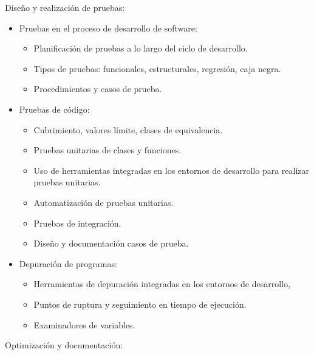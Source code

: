 \documentclass[a4paper]{article}
\begin{document}
Diseño y realización de pruebas:
\begin{itemize}
\item Pruebas en el proceso de desarrollo de software:
\begin{itemize}
\item Planificación de pruebas a lo largo del ciclo de desarrollo.
\item Tipos de pruebas: funcionales, estructurales, regresión, caja negra.
\item Procedimientos y casos de prueba.
\end{itemize}
\item Pruebas de código:
\begin{itemize}
\item Cubrimiento, valores límite, clases de equivalencia.
\item Pruebas unitarias de clases y funciones.
\item Uso de herramientas integradas en los entornos de desarrollo para realizar pruebas unitarias.
\item Automatización de pruebas unitarias.
\item Pruebas de integración.
\item Diseño y documentación casos de prueba.
\end{itemize}
\item Depuración de programas:
\begin{itemize}
\item Herramientas de depuración integradas en los entornos de desarrollo,
\item Puntos de ruptura y seguimiento en tiempo de ejecución.
\item Examinadores de variables.
\end{itemize}
\end{itemize}
Optimización y documentación:
\end{document}
